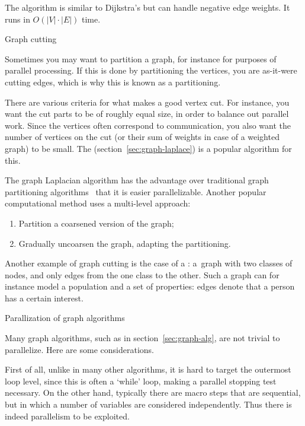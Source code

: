 The  algorithm is similar to Dijkstra's but can
handle negative edge weights.
It runs in $O\left(|V|\cdot |E|\right)$ time.

 {Graph cutting}

Sometimes you may want to partition a graph, for instance for purposes
of parallel processing. If this is done by partitioning the vertices,
you are as-it-were cutting edges, which is why this is known as a
 partitioning.

There are various criteria for
what makes a good vertex cut.
For instance, you want the cut parts to
be of roughly equal size, in order to balance out parallel work.
Since the
vertices often correspond to communication,
you also want the number of vertices on the cut
(or their sum of weights in case of a weighted graph)
to be small.
The  (section~\ref{sec:graph-laplace})
is a popular algorithm for this.

The graph Laplacian algorithm has the advantage over
traditional graph partitioning algorithms~\cite{LiTa:separator}
that it is easier parallelizable.
Another popular computational method uses a multi-level approach:
\begin{enumerate}
\item Partition a coarsened version of the graph;
\item Gradually uncoarsen the graph, adapting the partitioning.
\end{enumerate}

Another example of graph cutting is the case of a
: a~graph with two classes of nodes,
and only edges from the one class to the other. Such a graph can for
instance model a population and a set of properties: edges denote that
a person has a certain interest.

 {Parallization of graph algorithms}

Many graph algorithms, such as in section~\ref{sec:graph-alg}, are not
trivial to parallelize. Here are some considerations.


First of all, unlike in many other algorithms, it is hard to target
the outermost loop level, since this is often a `while' loop, making a
parallel stopping test necessary.  On the other hand, typically there
are macro steps that are sequential, but in which a number of
variables are considered independently. Thus there is indeed
parallelism to be exploited.

